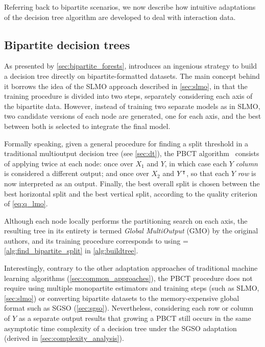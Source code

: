 Referring back to bipartite scenarios, we now describe how intuitive adaptations of the decision tree algorithm are developed to deal with interaction data.


\subsection{Bipartite decision trees}
\label{sec:bipartite_trees}

As presented by \autoref{sec:bipartite_forests}, \textcite{pliakos2018global} introduces an ingenious strategy to build a decision tree directly on bipartite-formatted datasets. The main concept behind it borrows the idea of the SLMO approach described in \autoref{sec:slmo}, in that the training procedure is divided into two steps, separately considering each axis of the bipartite data. However, instead of training two separate models as in SLMO, two candidate versions of each node are generated, one for each axis, and the best between both is selected to integrate the final model.

Formally speaking, given a general procedure \FindSplit for finding a split threshold in a traditional multioutput decision tree (see \autoref{sec:dt}), the PBCT algorithm~\cite{pliakos2018global} consists of applying \FindSplit twice at each node: once over $X_1$ and $Y$, in which case each $Y$ \emph{column} is considered a different output; and once over $X_2$ and $Y^\intercal$, so that each $Y$ \emph{row} is now interpreted as an output. Finally, the best overall split is chosen between the best horizontal split and the best vertical split, according to the quality criterion of \autoref{eq:q_lmo}.

Although each node locally performs the partitioning search on each axis, the resulting tree in its entirety is termed \emph{Global MultiOutput} (GMO) by the original authors, and its training procedure corresponds to using \FindSplit = \ref{alg:find_bipartite_split} in \ref{alg:buildtree}.

\algFindBipartiteSplit

Interestingly, contrary to the other adaptation approaches of traditional machine learning algorithms (\autoref{sec:common_approaches}), the PBCT procedure does not require using multiple monopartite estimators and training steps (such as SLMO, \autoref{sec:slmo}) or converting bipartite datasets to the memory-expensive global format such as SGSO (\autoref{sec:sgso}). Nevertheless, considering each row or column of $Y$ as a separate output results that growing a PBCT still occurs in the same asymptotic time complexity of a decision tree under the SGSO adaptation (derived in \autoref{sec:complexity_analysis}). 

